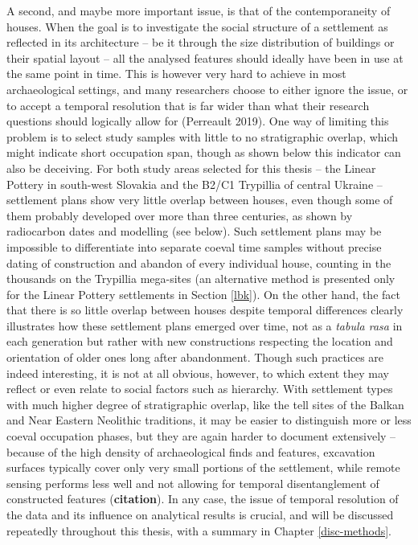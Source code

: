 \documentclass[
  12pt,
]{book}
\begin{document}
A second, and maybe more important issue, is that of the contemporaneity of houses. When the goal is to investigate the social structure of a settlement as reflected in its architecture -- be it through the size distribution of buildings or their spatial layout -- all the analysed features should ideally have been in use at the same point in time. This is however very hard to achieve in most archaeological settings, and many researchers choose to either ignore the issue, or to accept a temporal resolution that is far wider than what their research questions should logically allow for (Perreault 2019). One way of limiting this problem is to select study samples with little to no stratigraphic overlap, which might indicate short occupation span, though as shown below this indicator can also be deceiving. For both study areas selected for this thesis -- the Linear Pottery in south-west Slovakia and the B2/C1 Trypillia of central Ukraine -- settlement plans show very little overlap between houses, even though some of them probably developed over more than three centuries, as shown by radiocarbon dates and modelling (see below). Such settlement plans may be impossible to differentiate into separate coeval time samples without precise dating of construction and abandon of every individual house, counting in the thousands on the Trypillia mega-sites (an alternative method is presented only for the Linear Pottery settlements in Section \ref{lbk}). On the other hand, the fact that there is so little overlap between houses despite temporal differences clearly illustrates how these settlement plans emerged over time, not as a \emph{tabula rasa} in each generation but rather with new constructions respecting the location and orientation of older ones long after abandonment. Though such practices are indeed interesting, it is not at all obvious, however, to which extent they may reflect or even relate to social factors such as hierarchy. With settlement types with much higher degree of stratigraphic overlap, like the tell sites of the Balkan and Near Eastern Neolithic traditions, it may be easier to distinguish more or less coeval occupation phases, but they are again harder to document extensively -- because of the high density of archaeological finds and features, excavation surfaces typically cover only very small portions of the settlement, while remote sensing performs less well and not allowing for temporal disentanglement of constructed features (\textbf{citation}). In any case, the issue of temporal resolution of the data and its influence on analytical results is crucial, and will be discussed repeatedly throughout this thesis, with a summary in Chapter \ref{disc-methods}.
\end{document}
